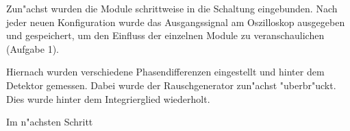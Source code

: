 \documentclass{scrartcl}
\begin{document}
Zun"achst wurden die Module schrittweise in die Schaltung eingebunden.
Nach jeder neuen Konfiguration wurde das Ausgangssignal am Oszilloskop ausgegeben und gespeichert,
um den Einfluss der einzelnen Module zu veranschaulichen (Aufgabe 1).

Hiernach wurden verschiedene Phasendifferenzen eingestellt und hinter dem Detektor gemessen.
Dabei wurde der Rauschgenerator zun"achst "uberbr"uckt.
Dies wurde hinter dem Integrierglied wiederholt.

Im n"achsten Schritt 
\end{document}
